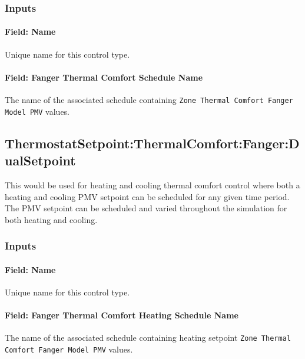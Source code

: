 \subsubsection{Inputs}\label{inputs-12-020}

\paragraph{Field: Name}\label{field-name-10-019}

Unique name for this control type.

\paragraph{Field: Fanger Thermal Comfort Schedule Name}\label{field-fanger-thermal-comfort-schedule-name-2}

The name of the associated schedule containing \lstinline!Zone Thermal Comfort Fanger Model PMV! values.

\subsection{ThermostatSetpoint:ThermalComfort:Fanger:DualSetpoint}\label{thermostatsetpointthermalcomfortfangerdualsetpoint}

This would be used for heating and cooling thermal comfort control where both a heating and cooling PMV setpoint can be scheduled for any given time period. The PMV setpoint can be scheduled and varied throughout the simulation for both heating and cooling.

\subsubsection{Inputs}\label{inputs-13-017}

\paragraph{Field: Name}\label{field-name-11-016}

Unique name for this control type.

\paragraph{Field: Fanger Thermal Comfort Heating Schedule Name}\label{field-fanger-thermal-comfort-heating-schedule-name}

The name of the associated schedule containing heating setpoint \lstinline!Zone Thermal Comfort Fanger Model PMV! values.

